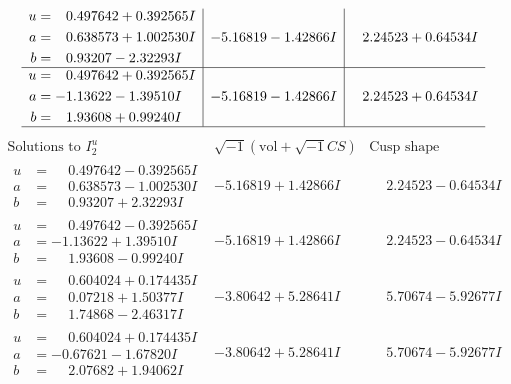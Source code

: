 \documentclass[1p]{elsarticle_modified}
\theoremstyle{definition}
\newcommand{\I}{\sqrt{-1}}
\begin{document}
$$\begin{array}{c|c|c}
\begin{aligned}
u &= \phantom{-}0.497642 + 0.392565 I \\
a &= \phantom{-}0.638573 + 1.002530 I \\
b &= \phantom{-}0.93207 - 2.32293 I\end{aligned}
 & -5.16819 - 1.42866 I & \phantom{-}2.24523 + 0.64534 I \\ \hline\begin{aligned}
u &= \phantom{-}0.497642 + 0.392565 I \\
a &= -1.13622 - 1.39510 I \\
b &= \phantom{-}1.93608 + 0.99240 I\end{aligned}
 & -5.16819 - 1.42866 I & \phantom{-}2.24523 + 0.64534 I\\
 \hline 
 \end{array}$$\newpage$$\begin{array}{c|c|c}  
\text{Solutions to }I^u_{2}& \I (\text{vol} + \sqrt{-1}CS) & \text{Cusp shape}\\
 \hline 
\begin{aligned}
u &= \phantom{-}0.497642 - 0.392565 I \\
a &= \phantom{-}0.638573 - 1.002530 I \\
b &= \phantom{-}0.93207 + 2.32293 I\end{aligned}
 & -5.16819 + 1.42866 I & \phantom{-}2.24523 - 0.64534 I \\ \hline\begin{aligned}
u &= \phantom{-}0.497642 - 0.392565 I \\
a &= -1.13622 + 1.39510 I \\
b &= \phantom{-}1.93608 - 0.99240 I\end{aligned}
 & -5.16819 + 1.42866 I & \phantom{-}2.24523 - 0.64534 I \\ \hline\begin{aligned}
u &= \phantom{-}0.604024 + 0.174435 I \\
a &= \phantom{-}0.07218 + 1.50377 I \\
b &= \phantom{-}1.74868 - 2.46317 I\end{aligned}
 & -3.80642 + 5.28641 I & \phantom{-}5.70674 - 5.92677 I \\ \hline\begin{aligned}
u &= \phantom{-}0.604024 + 0.174435 I \\
a &= -0.67621 - 1.67820 I \\
b &= \phantom{-}2.07682 + 1.94062 I\end{aligned}
 & -3.80642 + 5.28641 I & \phantom{-}5.70674 - 5.92677 I \\ \hline\begin{aligned}

\end{aligned}
\end{array}$$
\end{document}

